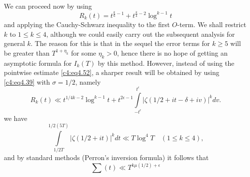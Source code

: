 We can proceed now by using
\begin{equation}
  R_k (t) = t^{\frac{k}{6}-1} + t^{\frac{k}{4}-2} \log
  ^{k-1}t\label{c4:eq4.52} 
\end{equation}
and applying the Cauchy-Schwarz inequality to the first $O$-term. We
shall restrict $k$ to $1 \leq k \leq 4$, although we could easily
carry out the subsequent analysis for general $k$. The reason for this
is that in the sequel the error terms for $k \geq 5$ will be greater
than $T^{1+ \eta_k}$ for some $\eta_k> 0$, hence there is no hope of
getting an asymptotic formula for $I_k(T)$ by this method. However,
instead of using the pointwise estimate \eqref{c4:eq4.52}, a sharper
result will be obtained by using \eqref{c4:eq4.39} with $\sigma =
1/2$, namely
\begin{equation}
  R_k (t) \ll t^{1/4 k-2} \log^{k-1} t + t^{2 \epsilon -1}
  \int\limits_{-t^\epsilon}^{t^\epsilon} | \zeta (1/2 + it - \delta +
  iv)|^k dv.\label{c4:eq4.53} 
\end{equation}
we have 
$$
\int\limits_{1/2T}^{1/2 (5T)} |\zeta (1/2 + it)|^k dt \ll T \log^4T
\quad (1 \leq k \leq 4),
$$
and by standard methods (Perron's inversion formula) it follows that
$$
\sum(t) \ll T^{k \mu (1/2)+ \epsilon}
$$

